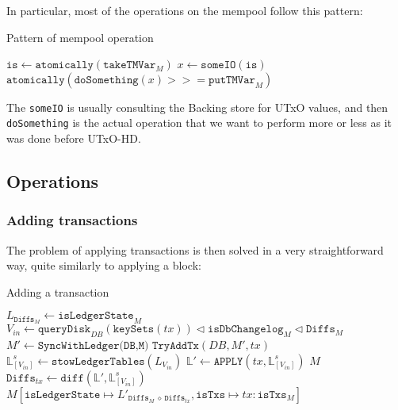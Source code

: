 \documentclass[11pt,a4paper]{article}
\theoremstyle{definition}
\begin{document}
In particular, most of the operations on the mempool follow this pattern:

\begin{algorithm}
  \caption{Pattern of mempool operation}
  \begin{algorithmic}[1]
    \State $\texttt{is} \gets \texttt{atomically} (\texttt{takeTMVar}_{M}) $
    \State $x \gets \texttt{someIO}(\texttt{is})$
    \State $\texttt{atomically}(\texttt{doSomething}(x) >>= \texttt{putTMVar}_{M})$
    \EndProcedure
 \end{algorithmic}
\end{algorithm}

The \texttt{someIO} is usually consulting the Backing store for UTxO values, and
then \texttt{doSomething} is the actual operation that we want to perform more
or less as it was done before UTxO-HD.

\subsection{Operations}

\subsubsection{Adding transactions}

The problem of applying transactions is then solved in a very straightforward
way, quite similarly to applying a block:

\begin{algorithm}
  \caption{Adding a transaction}
  \begin{algorithmic}[1]
    \State $L_{\texttt{Diffs}_{M}} \gets \texttt{isLedgerState}_{M}$
    \State $V_{in} \gets \texttt{queryDisk}_{DB}(\texttt{keySets}(tx)) \triangleleft \texttt{isDbChangelog}_{M} \triangleleft \texttt{Diffs}_{M}$
    \State $M' \gets \texttt{SyncWithLedger(DB,M)}$
    \State $\texttt{TryAddTx}(DB,M',tx)$
    \Else
    \State $\mathbb{L}^{s}_{[V_{in}]} \gets \texttt{stowLedgerTables}(L_{V_{in}})$
    \State $\mathbb{L}' \gets \texttt{APPLY}(tx, \mathbb{L}^{s}_{[V_{in}]})$
    \State \Return $M$
    \Else
    \State $\texttt{Diffs}_{tx} \gets \texttt{diff}(\mathbb{L}', \mathbb{L}^{s}_{[V_{in}]})$
    \State \Return $M [ \texttt{isLedgerState} \mapsto L'_{\texttt{Diffs}_{M}~\diamond~\texttt{Diffs}_{tx}}, \texttt{isTxs} \mapsto tx: \texttt{isTxs}_{M}]$
    \EndIf
    \EndIf
    \EndProcedure
 \end{algorithmic}
\end{algorithm}
\end{document}
